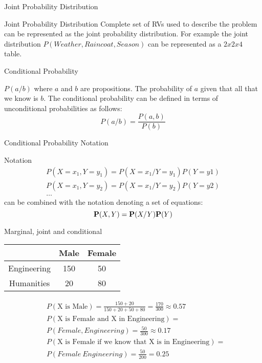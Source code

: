 \documentclass[12pt]{beamer}
\begin{document}
\begin{frame}{Joint Probability Distribution} 
\begin{block}{Joint Probability Distribution} 
Complete set of RVs used to describe the problem can be represented as
the joint probability distribution. For example the joint distribution 
$P(Weather,Raincoat, Season)$ can be represented as a $2 x 2 x 4$ table. 
\end{block} 
\end{frame}


\begin{frame}{Conditional Probability}
\begin{definition} 
$P(a/b)$ where $a$ and $b$ are propositions.  The probability of $a$
  given that all that we know is $b$. The conditional probability can
  be defined in terms of unconditional probabilities as follows:
\begin{equation} 
P(a/b) = \frac{P(a,b)}{P(b)}
\end{equation}  
\end{definition} 
\end{frame}

\begin{frame}{Conditional Probability Notation}
\begin{block}{Notation} 
\begin{eqnarray}
P(X = x_1, Y = y_1) = P(X = x_1 / Y = y_1) P(Y=y1) \\ 
P(X = x_1, Y = y_2) = P(X = x_1 / Y = y_2) P(Y=y2) \\ 
\dots 
\end{eqnarray}
can be combined with the notation denoting a set of equations: 
\begin{equation} 
{\bf P}(X,Y) = {\bf P}(X/Y) {\bf P}(Y)
\end{equation} 
\end{block} 
\end{frame}

\begin{frame}{Marginal, joint and conditional} 

\begin{table} 
\begin{tabular}{|c|c|c|}
\hline 
             & Male & Female \\  
\hline
Engineering  & 150  &  50    \\ 
\hline 
Humanities   & 20   &  80     \\ 
\hline 
\end{tabular} 
\end{table} 

\begin{align*} 
& P(\mbox{X is Male}) = \frac{150+20}{150+20+50+80} = \frac{170}{300} \approx 0.57  \\
& P(\mbox{X is Female and X in Engineering}) = \\ 
& P(Female, Engineering) = \frac{50}{300} \approx 0.17 \\ 
& P(\mbox{X is Female if we know that X is in Engineering}) = \\ 
& P(Female \ Engineering) = \frac{50}{200} = 0.25 
\end{align*} 


\end{frame} 
\end{document}
